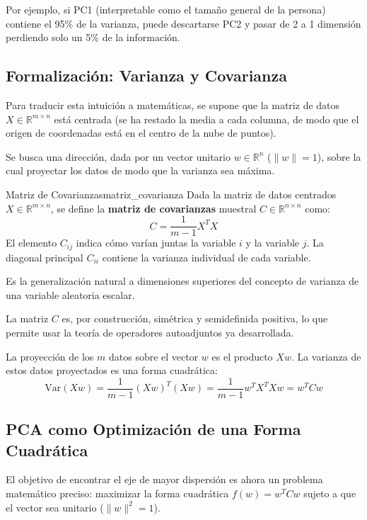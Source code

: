 \documentclass[11pt, a4paper]{article}
\begin{document}
Por ejemplo, si PC1 (interpretable como el tamaño general de la persona) contiene el 95\% de la varianza, puede descartarse PC2 y pasar de 2 a 1 dimensión perdiendo solo un 5\% de la información.

\subsection{Formalización: Varianza y Covarianza}

Para traducir esta intuición a matemáticas, se supone que la matriz de datos $X \in \mathbb{R}^{m \times n}$ está centrada (se ha restado la media a cada columna, de modo que el origen de coordenadas está en el centro de la nube de puntos).

Se busca una dirección, dada por un vector unitario $w \in \mathbb{R}^n$ ($\|w\| = 1$), sobre la cual proyectar los datos de modo que la varianza sea máxima.

\begin{definicion}{Matriz de Covarianzas}{matriz_covarianza}
Dada la matriz de datos centrados $X \in \mathbb{R}^{m \times n}$, se define la \textbf{matriz de covarianzas} muestral $C \in \mathbb{R}^{n \times n}$ como:
\[ C = \frac{1}{m-1} X^T X \]
El elemento $C_{ij}$ indica cómo varían juntas la variable $i$ y la variable $j$. La diagonal principal $C_{ii}$ contiene la varianza individual de cada variable.
\end{definicion}

\obs Es la generalización natural a dimensiones superiores del concepto de varianza de una variable aleatoria escalar.

\obs La matriz $C$ es, por construcción, simétrica y semidefinida positiva, lo que permite usar la teoría de operadores autoadjuntos ya desarrollada.

La proyección de los $m$ datos sobre el vector $w$ es el producto $Xw$. La varianza de estos datos proyectados es una forma cuadrática:
\[ \text{Var}(Xw) = \frac{1}{m-1} (Xw)^T (Xw) = \frac{1}{m-1} w^T X^T X w = w^T C w \]

\subsection{PCA como Optimización de una Forma Cuadrática}

El objetivo de encontrar el eje de mayor dispersión es ahora un problema matemático preciso: maximizar la forma cuadrática $f(w) = w^T C w$ sujeto a que el vector sea unitario ($\|w\|^2 = 1$).
\end{document}
